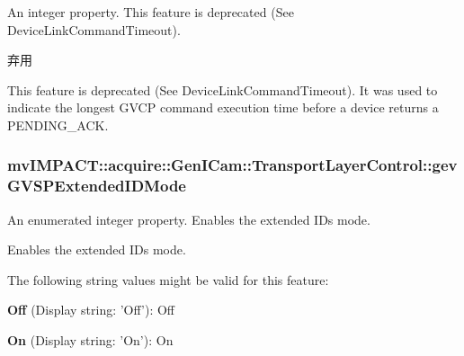 An integer property. This feature is deprecated (See Device\+Link\+Command\+Timeout). 

\begin{DoxyRefDesc}{弃用}
\item[\hyperlink{deprecated__deprecated000083}{弃用}]This feature is deprecated (See Device\+Link\+Command\+Timeout). It was used to indicate the longest G\+V\+C\+P command execution time before a device returns a P\+E\+N\+D\+I\+N\+G\+\_\+\+A\+C\+K. \end{DoxyRefDesc}
\hypertarget{classmv_i_m_p_a_c_t_1_1acquire_1_1_gen_i_cam_1_1_transport_layer_control_ae3437f11964375fddbad661cc5d000b3}{
\subsubsection[{gev\+G\+V\+S\+P\+Extended\+I\+D\+Mode}]{ mv\+I\+M\+P\+A\+C\+T\+::acquire\+::\+Gen\+I\+Cam\+::\+Transport\+Layer\+Control\+::gev\+G\+V\+S\+P\+Extended\+I\+D\+Mode}}\label{classmv_i_m_p_a_c_t_1_1acquire_1_1_gen_i_cam_1_1_transport_layer_control_ae3437f11964375fddbad661cc5d000b3}


An enumerated integer property. Enables the extended I\+Ds mode. 

Enables the extended I\+Ds mode.

The following string values might be valid for this feature\+:
\begin{DoxyItemize}
\item {\bfseries Off} (Display string\+: 'Off')\+: Off
\item {\bfseries On} (Display string\+: 'On')\+: On
\end{DoxyItemize}

